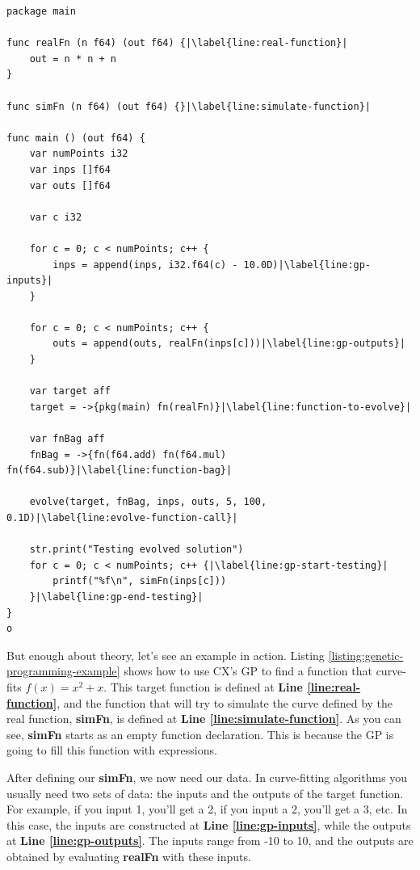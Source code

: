 \documentclass[11pt,fleqn,openany]{book} %
\begin{document}
\begin{lstlisting}[caption={Using Genetic Programming to Evolve a Function},captionpos=b,label={listing:genetic-programming-example}]
package main

func realFn (n f64) (out f64) {|\label{line:real-function}|
    out = n * n + n
}

func simFn (n f64) (out f64) {}|\label{line:simulate-function}|

func main () (out f64) {
	var numPoints i32
    var inps []f64
    var outs []f64
    
    var c i32
    
	for c = 0; c < numPoints; c++ {
        inps = append(inps, i32.f64(c) - 10.0D)|\label{line:gp-inputs}|
	}

	for c = 0; c < numPoints; c++ {
        outs = append(outs, realFn(inps[c]))|\label{line:gp-outputs}|
	}
	
    var target aff
    target = ->{pkg(main) fn(realFn)}|\label{line:function-to-evolve}|
    
    var fnBag aff
    fnBag = ->{fn(f64.add) fn(f64.mul) fn(f64.sub)}|\label{line:function-bag}|
    
	evolve(target, fnBag, inps, outs, 5, 100, 0.1D)|\label{line:evolve-function-call}|

	str.print("Testing evolved solution")
	for c = 0; c < numPoints; c++ {|\label{line:gp-start-testing}|
        printf("%f\n", simFn(inps[c]))
	}|\label{line:gp-end-testing}|
}
o\end{lstlisting}

But enough about theory, let's see an example in action. Listing \ref{listing:genetic-programming-example} shows how to use CX's GP to find a function that curve-fits $f(x) = x^2 + x$. This target function is defined at \textbf{Line \ref{line:real-function}}, and the function that will try to simulate the curve defined by the real function, \textbf{simFn}, is defined at \textbf{Line \ref{line:simulate-function}}. As you can see, \textbf{simFn} starts as an empty function declaration. This is because the GP is going to fill this function with expressions.

After defining our \textbf{simFn}, we now need our data. In curve-fitting algorithms you usually need two sets of data: the inputs and the outputs of the target function. For example, if you input 1, you'll get a 2, if you input a 2, you'll get a 3, etc. In this case, the inputs are constructed at \textbf{Line \ref{line:gp-inputs}}, while the outputs at \textbf{Line \ref{line:gp-outputs}}. The inputs range from -10 to 10, and the outputs are obtained by evaluating \textbf{realFn} with these inputs.
\end{document}
